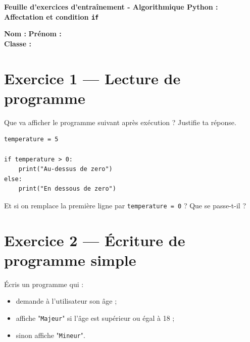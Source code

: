 \documentclass[9pt,a4paper]{article}
\begin{document}
\centering\textbf{Feuille d’exercices d’entraînement - Algorithmique Python : Affectation et condition \texttt{if}}\\
\vspace{0.5cm}

\noindent\textbf{Nom :} \underline{\hspace{5cm}} \hfill \textbf{Prénom :} \underline{\hspace{5cm}} \\
\textbf{Classe :} \underline{\hspace{5cm}}\\
\vspace{1cm}

\section*{Exercice 1 — Lecture de programme}

\noindent Que va afficher le programme suivant après exécution ? Justifie ta réponse.

\begin{lstlisting}
temperature = 5

if temperature > 0:
    print("Au-dessus de zero")
else:
    print("En dessous de zero")
\end{lstlisting}

\begin{tcolorbox}[colframe=black, colback=white, width=\linewidth]
\vspace{3cm}
\end{tcolorbox}

\vspace{0.3cm}

\noindent Et si on remplace la première ligne par \texttt{temperature = 0} ? Que se passe-t-il ?

\begin{tcolorbox}[colframe=black, colback=white, width=\linewidth]
\vspace{3cm}
\end{tcolorbox}

\vspace{1cm}

\section*{Exercice 2 — Écriture de programme simple}

\noindent Écris un programme qui :
\begin{itemize}
    \item demande à l’utilisateur son âge ;
    \item affiche "\texttt{Majeur}" si l’âge est supérieur ou égal à 18 ;
    \item sinon affiche "\texttt{Mineur}".
\end{itemize}
\end{document}
